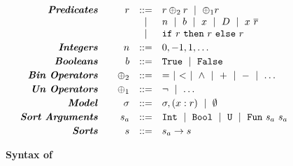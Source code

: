 \begin{figure}[t!]
\centering
$$
\begin{array}{rrcl}
\emphbf{Predicates} \quad
  & \pred & ::= &
    \pred \binop \pred \spmid
    \unop \pred \\
  && \spmid & n \spmid b \spmid x \spmid \dc \spmid  x\ \overline{\pred}\\
  && \spmid & \eif{\pred}{\pred}{\pred}
\\[0.03in]

\emphbf{Integers} \quad
  & n
  & ::= & 0, -1, 1, \dots
\\[0.03in]

\emphbf{Booleans} \quad
  & b
  & ::= & \etrue \spmid \efalse
\\[0.03in]

\emphbf{Bin Operators} \quad
  & \binop
  & ::= & = \spmid < \spmid \land \spmid + \spmid - \spmid \dots
\\[0.03in]

\emphbf{Un Operators} \quad
  & \unop
  & ::= & \lnot \spmid \dots 
\\[0.03in]

\emphbf{Model} \quad
  & \sigma
  & ::= & \sigma, (x:\pred) \spmid \emptyset
\\[0.03in]

\emphbf{Sort Arguments} \quad
  & \sort_a
  & ::= & \tint \spmid \tbool \spmid \tuniv 
         \spmid \tsmtfun{\sort_a}{\sort_a}
\\[0.03in]
\emphbf{Sorts} \quad
  & \sort
  & ::=  & \sort_a \rightarrow \sort
\end{array}
$$
\caption{\textbf{Syntax of \smtlan}}
\label{fig:smtsyntax}
\end{figure}
